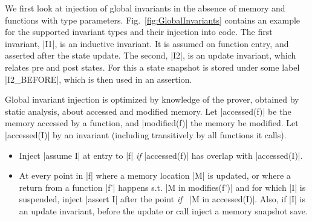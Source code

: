 
We first look at injection of global invariants in the absence of memory and
functions with type parameters. Fig.~\ref{fig:GlobalInvariants} contains an
example for the supported invariant types and their injection into code. The
first invariant, |I1|, is an inductive invariant. It is assumed on function
entry, and asserted after the state update. The second, |I2|, is an update
invariant, which relates pre and post states. For this a state snapshot is
stored under some label |I2_BEFORE|, which is then used in an assertion.

Global invariant injection is optimized by knowledge of the prover, obtained by
static analysis, about accessed and modified memory.  Let |accessed(f)| be the
memory accessed by a function, and |modified(f)| the memory be modified. Let
|accessed(I)| by an invariant (including transitively by all functions it
calls).

\begin{itemize}
\item Inject |assume I| at entry to |f| \emph{if} |accessed(f)| has overlap with
  |accessed(I)|.
\item At every point in |f| where a memory location |M| is updated, or where a
  return from a function |f'| happens s.t. |M in modifies(f')| and for
  which |I| is suspended, inject |assert I| after the point \emph{if}~%
  |M in accessed(I)|. Also, if |I| is an update invariant, before the update or
  call inject a memory snapshot save.
\end{itemize}


